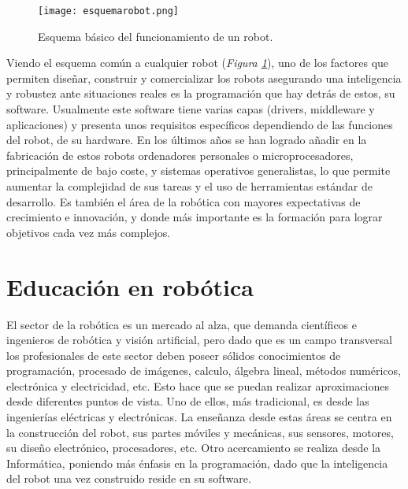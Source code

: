 \begin{figure}[h]
	\centering\texttt{[image: esquemarobot.png]}
	\caption{Esquema básico del funcionamiento de un robot.}
	\label{fig:esquemarobot}
\end{figure}

Viendo el esquema común a cualquier robot (\textit{Figura \ref{fig:esquemarobot}}), uno de los factores que permiten diseñar, construir y comercializar los robots asegurando una inteligencia y robustez ante situaciones reales es la programación que hay detrás de estos, su software. Usualmente este software tiene varias capas (drivers, middleware y aplicaciones) y presenta unos requisitos específicos dependiendo de las funciones del robot, de su hardware. En los últimos años se han logrado añadir en la fabricación de estos robots ordenadores personales o microprocesadores, principalmente de bajo coste, y sistemas operativos generalistas, lo que permite aumentar la complejidad de sus tareas y el uso de herramientas estándar de desarrollo. Es también el área de la robótica con mayores expectativas de crecimiento e innovación, y donde más importante es la formación para lograr objetivos cada vez más complejos.


\section{Educación en robótica}
\label{sec:intr_educacionrobotica}

El sector de la robótica es un mercado al alza, que demanda científicos e ingenieros de robótica y visión artificial, pero dado que es un campo transversal los profesionales de este sector deben poseer sólidos conocimientos de programación, procesado de imágenes, calculo, álgebra lineal, métodos numéricos, electrónica y electricidad, etc. Esto hace que se puedan realizar aproximaciones desde diferentes puntos de vista. Uno de ellos, más tradicional, es desde las ingenierías eléctricas y electrónicas. La enseñanza desde estas áreas se centra en la construcción del robot, sus partes móviles y mecánicas, sus sensores, motores, su diseño electrónico, procesadores, etc. Otro acercamiento se realiza desde la Informática, poniendo más énfasis en la programación, dado que la inteligencia del robot una vez construido reside en su software.

